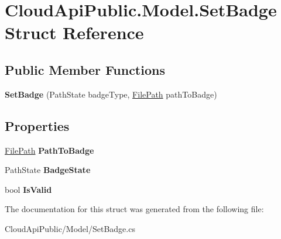 \hypertarget{struct_cloud_api_public_1_1_model_1_1_set_badge}{\section{Cloud\-Api\-Public.\-Model.\-Set\-Badge Struct Reference}
\label{struct_cloud_api_public_1_1_model_1_1_set_badge}
}
\subsection*{Public Member Functions}
\begin{DoxyCompactItemize}
\item 
\hypertarget{struct_cloud_api_public_1_1_model_1_1_set_badge_a7f2b121c29fe81bb6e818b0a9f571433}{{\bfseries Set\-Badge} (Path\-State badge\-Type, \hyperlink{class_cloud_api_public_1_1_model_1_1_file_path}{File\-Path} path\-To\-Badge)}\label{struct_cloud_api_public_1_1_model_1_1_set_badge_a7f2b121c29fe81bb6e818b0a9f571433}

\end{DoxyCompactItemize}
\subsection*{Properties}
\begin{DoxyCompactItemize}
\item 
\hypertarget{struct_cloud_api_public_1_1_model_1_1_set_badge_a7cdb34ec777ebecaae9bf1d938952e99}{\hyperlink{class_cloud_api_public_1_1_model_1_1_file_path}{File\-Path} {\bfseries Path\-To\-Badge}}\label{struct_cloud_api_public_1_1_model_1_1_set_badge_a7cdb34ec777ebecaae9bf1d938952e99}

\item 
\hypertarget{struct_cloud_api_public_1_1_model_1_1_set_badge_af5713b23fd57c83db5c908a0e697b698}{Path\-State {\bfseries Badge\-State}}\label{struct_cloud_api_public_1_1_model_1_1_set_badge_af5713b23fd57c83db5c908a0e697b698}

\item 
\hypertarget{struct_cloud_api_public_1_1_model_1_1_set_badge_a99f896f88b7f8469f97b9328758fae01}{bool {\bfseries Is\-Valid}}\label{struct_cloud_api_public_1_1_model_1_1_set_badge_a99f896f88b7f8469f97b9328758fae01}

\end{DoxyCompactItemize}


The documentation for this struct was generated from the following file\-:\begin{DoxyCompactItemize}
\item 
Cloud\-Api\-Public/\-Model/Set\-Badge.\-cs\end{DoxyCompactItemize}
